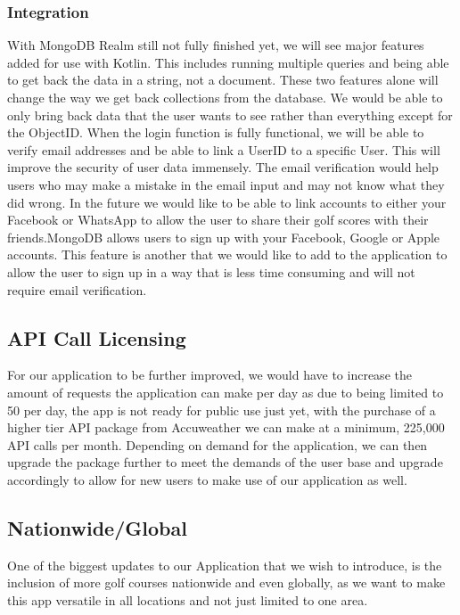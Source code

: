 \subsubsection{Integration}
With MongoDB Realm still not fully finished yet, we will see major features added for use with Kotlin. This includes running multiple queries and being able to get back the data in a string, not a document. These two features alone will change the way we get back collections from the database. We would be able to only bring back data that the user wants to see rather than everything except for the ObjectID. 
\newline
\newline
When the login function is fully functional, we will be able to verify email addresses and be able to link a UserID to a specific User. This will improve the security of user data immensely. The email verification would help users who may make a mistake in the email input and may not know what they did wrong.
\newline
\newline
In the future we would like to be able to link accounts to either your Facebook or WhatsApp to allow the user to share their golf scores with their friends.MongoDB allows users to sign up with your Facebook, Google or Apple accounts. This feature is another that we would like to add to the application to allow the user to sign up in a way that is less time consuming and will not require email verification.
\subsection{API Call Licensing}
For our application to be further improved, we would have to increase the amount of requests the application can make per day as due to being limited to 50 per day, the app is not ready for public use just yet, with the purchase of a higher tier API package from Accuweather we can make at a minimum, 225,000 API calls per month. 
\newline
\newline
\newline
Depending on demand for the application, we can then upgrade the package further to meet the demands of the user base and upgrade accordingly to allow for new users to make use of our application as well. 
\subsection{Nationwide/Global}
One of the biggest updates to our Application that we wish to introduce, is the inclusion of more golf courses nationwide and even globally, as we want to make this app versatile in all locations and not just limited to one area.
